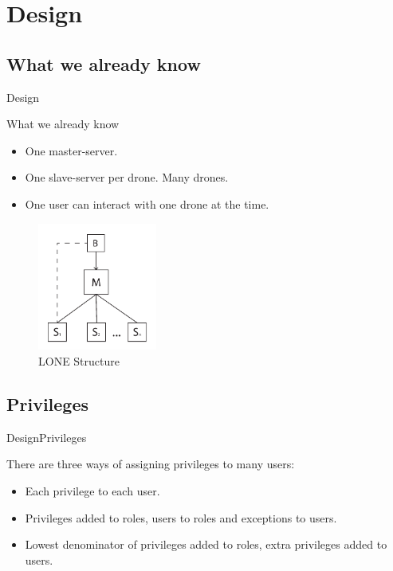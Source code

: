 
\author{Anders Eiler}
\section{Design}
\subsection{What we already know}
\begin{frame}{Design}
  \begin{block}{What we already know}
  \begin{itemize}
  	\item One master-server.
  	\item One slave-server per drone. Many drones. 
  	\item One user can interact with one drone at the time.
  \end{itemize}

  \begin{figure}[htb]
    \centering
    \includegraphics[width=0.35\textwidth]{gfx/slave_structure.pdf}
    \caption{LONE Structure}
  \end{figure}

  \end{block}
\end{frame}

\subsection{Privileges}
\begin{frame}{Design}{Privileges}
  \begin{block}{}
  	There are three ways of assigning privileges to many users:

  	\begin{itemize}
  		\item Each privilege to each user.
  		\item Privileges added to roles, users to roles and exceptions to users.
  		\item Lowest denominator of privileges added to roles, extra privileges added to users.
  	\end{itemize}

  \end{block}
\end{frame}

